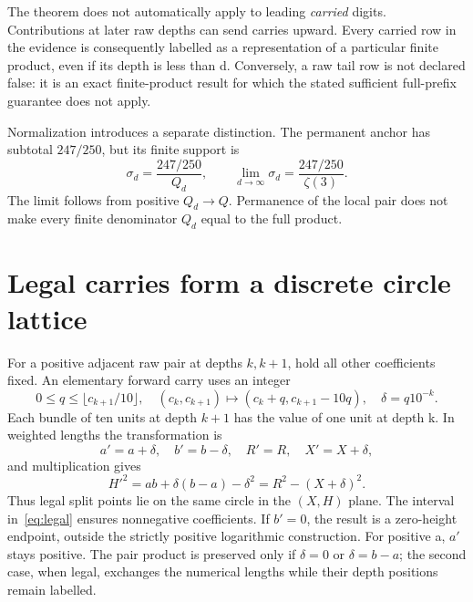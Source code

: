 \documentclass[11pt,a4paper]{article}
\begin{document}
The theorem does not automatically apply to leading \emph{carried} digits. Contributions at later raw depths can send carries upward. Every carried row in the evidence is consequently labelled as a representation of a particular finite product, even if its depth is less than d. Conversely, a raw tail row is not declared false: it is an exact finite-product result for which the stated sufficient full-prefix guarantee does not apply.

Normalization introduces a separate distinction. The permanent anchor has subtotal $247/250$, but its finite support is
\begin{equation}
\sigma_d=\frac{247/250}{Q_d},\qquad
\lim_{d\to\infty}\sigma_d=\frac{247/250}{\zeta(3)}.
\label{eq:support}
\end{equation}
The limit follows from positive $Q_d\to Q$. Permanence of the local pair does not make every finite denominator $Q_d$ equal to the full product.

\clearpage
\section{Legal carries form a discrete circle lattice}
\label{sec:carry}
For a positive adjacent raw pair at depths $k,k+1$, hold all other coefficients fixed. An elementary forward carry uses an integer
\begin{equation}
0\le q\le\lfloor c_{k+1}/10\rfloor,
\quad (c_k,c_{k+1})\mapsto(c_k+q,c_{k+1}-10q),
\quad \delta=q10^{-k}.
\label{eq:legal}
\end{equation}
Each bundle of ten units at depth $k+1$ has the value of one unit at depth k. In weighted lengths the transformation is
\begin{equation}
a'=a+\delta,\quad b'=b-\delta,\quad
R'=R,\quad X'=X+\delta,
\label{eq:carryRX}
\end{equation}
and multiplication gives
\begin{equation}
H'^2=ab+\delta(b-a)-\delta^2
=R^2-(X+\delta)^2.
\label{eq:carryH}
\end{equation}
Thus legal split points lie on the same circle in the $(X,H)$ plane. The interval in~\eqref{eq:legal} ensures nonnegative coefficients. If $b'=0$, the result is a zero-height endpoint, outside the strictly positive logarithmic construction. For positive a, $a'$ stays positive. The pair product is preserved only if $\delta=0$ or $\delta=b-a$; the second case, when legal, exchanges the numerical lengths while their depth positions remain labelled.
\end{document}

